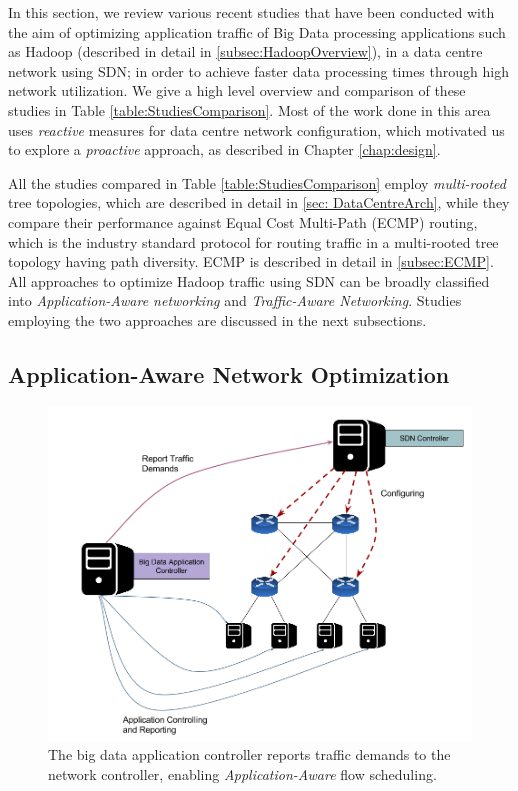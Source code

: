 In this section, we review various recent studies \cite{das2013transparent, wang2012programming, al2010hedera, narayan2012hadoop, neves2014pythia, wette2015hybridte} that have been conducted with the aim of optimizing application traffic of Big Data processing applications such as Hadoop \cite{HadoopWeb} (described in detail in \ref{subsec:HadoopOverview}), in a data centre network using SDN; in order to achieve faster data processing times through high network utilization. We give a high level overview and comparison of these studies in Table \ref{table:StudiesComparison}. Most of the work done in this area uses \textit{reactive} measures for data centre network configuration, which motivated us to explore a \textit{proactive} approach, as described in Chapter \ref{chap:design}. 

All the studies compared in Table \ref{table:StudiesComparison} employ \textit{multi-rooted} tree topologies, which are described in detail in \ref{sec: DataCentreArch}, while they compare their performance against Equal Cost Multi-Path (ECMP) \cite{hopps2000analysis} routing, which is the industry standard protocol for routing traffic in a multi-rooted tree topology having path diversity. ECMP is described in detail in \ref{subsec:ECMP}. All approaches to optimize Hadoop traffic using SDN can be broadly classified into \textit{Application-Aware networking} and \textit{Traffic-Aware Networking}. Studies employing the two approaches are discussed in the next subsections.

\subsection{Application-Aware Network Optimization} \label{subsec:AppAware}

\begin{figure}[!ht] 
	\centerline{\includegraphics[scale=0.40]{graphics/chapter2/ApplicationAwareScheduling.png}}
	\caption{The big data application controller reports traffic demands to the network controller, enabling \textit{Application-Aware} flow scheduling.}
	\label{fig:ApplicationAwareScheduling}
\end{figure}

